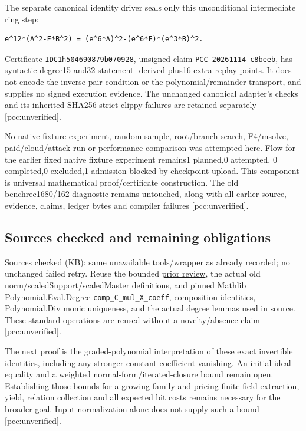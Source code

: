 \documentclass[
  10pt,
]{article}
\begin{document}
The separate canonical identity driver seals only this unconditional
intermediate ring step:

\begin{verbatim}
e^12*(A^2-F*B^2) = (e^6*A)^2-(e^6*F)*(e^3*B)^2.
\end{verbatim}

Certificate \texttt{IDC1h504690879b070928}, unsigned claim
\texttt{PCC-20261114-c8beeb}, has syntactic degree15 and32 statement-
derived plus16 extra replay points. It does not encode the inverse-pair
condition or the polynomial/remainder transport, and supplies no signed
execution evidence. The unchanged canonical adapter's checks and its
inherited SHA256 strict-clippy failures are retained separately
{[}pcc:unverified{]}.

No native fixture experiment, random sample, root/branch search,
F4/msolve, paid/cloud/attack run or performance comparison was attempted
here. Flow for the earlier fixed native fixture experiment remains1
planned,0 attempted, 0 completed,0 excluded,1 admission-blocked by
checkpoint upload. This component is universal mathematical
proof/certificate construction. The old benchrec1680/162 diagnostic
remains untouched, along with all earlier source, evidence, claims,
ledger bytes and compiler failures {[}pcc:unverified{]}.

\subsection{Sources checked and remaining
obligations}\label{sources-checked-and-remaining-obligations}

Sources checked (KB): same unavailable tools/wrapper as already
recorded; no unchanged failed retry. Reuse the bounded
\href{../weighted-leading-evidence/prior-search-receipt.json}{prior
review}, the actual old norm/scaledSupport/scaledMaster definitions, and
pinned Mathlib Polynomial.Eval.Degree \texttt{comp\_C\_mul\_X\_coeff},
composition identities, Polynomial.Div monic uniqueness, and the actual
degree lemmas used in source. These standard operations are reused
without a novelty/absence claim {[}pcc:unverified{]}.

The next proof is the graded-polynomial interpretation of these exact
invertible identities, including any stronger constant-coefficient
vanishing. An initial-ideal equality and a weighted
normal-form/iterated-closure bound remain open. Establishing those
bounds for a growing family and pricing finite-field extraction, yield,
relation collection and all expected bit costs remains necessary for the
broader goal. Input normalization alone does not supply such a bound
{[}pcc:unverified{]}.
\end{document}
